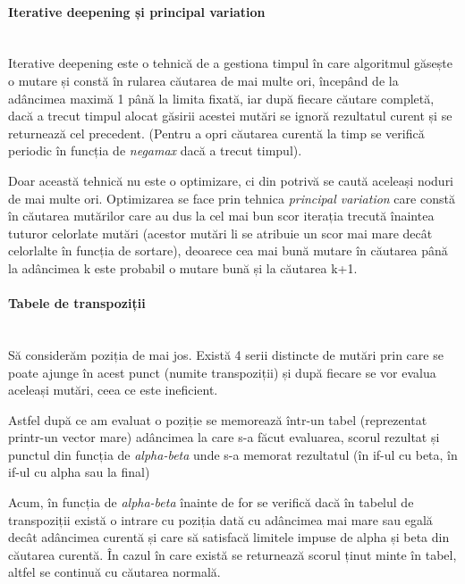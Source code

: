 \vspace{1cm}
\paragraph{Iterative deepening și principal variation}\mbox{} \\

Iterative deepening este o tehnică de a gestiona timpul în care algoritmul găsește o mutare
și constă în rularea căutarea de mai multe ori, începând de la adâncimea maximă 1 până la
limita fixată, iar după fiecare căutare completă, dacă a trecut timpul alocat găsirii acestei
mutări se ignoră rezultatul curent și se returnează cel precedent. (Pentru a opri căutarea
curentă la timp se verifică periodic în funcția de \textit{negamax} dacă a trecut timpul).

Doar această tehnică nu este o optimizare, ci din potrivă se caută aceleași noduri de mai multe
ori. Optimizarea se face prin tehnica \textit{principal variation} care constă în căutarea
mutărilor care au dus la cel mai bun scor iterația trecută înaintea tuturor celorlate mutări
(acestor mutări li se atribuie un scor mai mare decât celorlalte în funcția de sortare),
deoarece cea mai bună mutare în căutarea până la adâncimea k este probabil o mutare bună
și la căutarea k+1.

\vspace{1cm}
\paragraph{Tabele de transpoziții}\mbox{} \\

Să considerăm poziția de mai jos. Există 4 serii distincte de mutări prin care se poate ajunge
în acest punct (numite transpoziții) și după fiecare se vor evalua aceleași mutări,
ceea ce este ineficient.

Astfel după ce am evaluat o poziție se memorează într-un tabel (reprezentat printr-un vector mare)
adâncimea la care s-a făcut evaluarea, scorul rezultat și punctul din funcția de \textit{alpha-beta}
unde s-a memorat rezultatul (în if-ul cu beta, în if-ul cu alpha sau la final)

Acum, în funcția de \textit{alpha-beta} înainte de for se verifică dacă în tabelul de transpoziții
există o intrare cu poziția dată cu adâncimea mai mare sau egală decât adâncimea curentă și
care să satisfacă limitele impuse de alpha și beta din căutarea curentă. În cazul în care există
se returnează scorul ținut minte în tabel, altfel se continuă cu căutarea normală.

